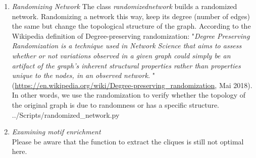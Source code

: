 \documentclass[10pt,a4paper]{article}
\begin{document}
\begin{enumerate}
\item \textit{Randomizing Network}
The class \textit{randomized\textunderscore network} builds a randomized network. Randomizing a network this way, keep its degree (number of edges) the same but change the topological structure of the graph. According to the Wikipedia definition of Degree-preserving randomization: "\textit{Degree Preserving Randomization is a technique used in Network Science that aims to assess whether or not variations observed in a given graph could simply be an artifact of the graph's inherent structural properties rather than properties unique to the nodes, in an observed network.} "(\url{https://en.wikipedia.org/wiki/Degree-preserving_randomization}, Mai 2018). In other words, we use the randomization to verify whether the topology of the original graph is due to randomness or has a specific structure. \\



 {../Scripts/randomized\string_network.py}



\newpage
\item \textit{Examining motif enrichment}\\
Please be aware that the function to extract the cliques is still not optimal here. 




\end{enumerate}
\end{document}
